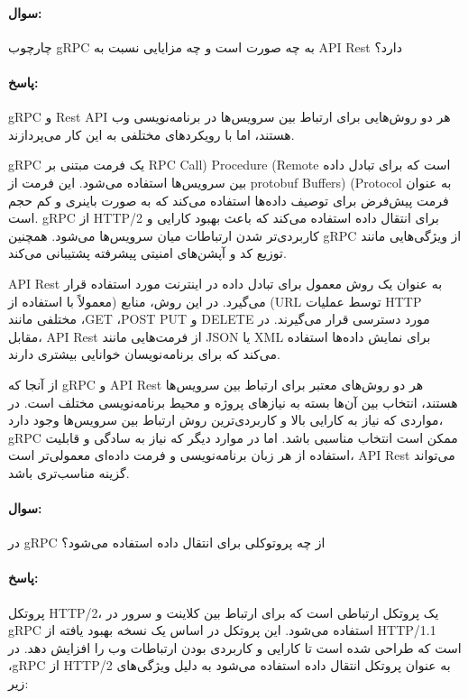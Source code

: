 \documentclass[a4paper,10pt]{article}
\begin{document}
    \paragraph{سوال:} چارچوب gRPC به چه صورت است و چه مزایایی نسبت به API Rest دارد؟

    \paragraph{پاسخ:} gRPC و Rest API هر دو روش‌هایی برای ارتباط بین سرویس‌ها در برنامه‌نویسی وب هستند، اما با رویکردهای مختلفی به این کار می‌پردازند.

    gRPC یک فرمت مبتنی بر RPC Call) Procedure (Remote است که برای تبادل داده بین سرویس‌ها استفاده می‌شود. این فرمت از protobuf Buffers) (Protocol به عنوان فرمت پیش‌فرض برای توصیف داده‌ها استفاده می‌کند که به صورت باینری و کم حجم است. gRPC از HTTP/2 برای انتقال داده استفاده می‌کند که باعث بهبود کارایی و کاربردی‌تر شدن ارتباطات میان سرویس‌ها می‌شود. همچنین gRPC از ویژگی‌هایی مانند توزیع کد و آپشن‌های امنیتی پیشرفته پشتیبانی می‌کند.
    
    API Rest به عنوان یک روش معمول برای تبادل داده در اینترنت مورد استفاده قرار می‌گیرد. در این روش، منابع (معمولاً با استفاده از (URL توسط عملیات HTTP مختلفی مانند ،GET ،POST PUT و DELETE مورد دسترسی قرار می‌گیرند. در مقابل، API Rest از فرمت‌هایی مانند JSON یا XML برای نمایش داده‌ها استفاده می‌کند که برای برنامه‌نویسان خوانایی بیشتری دارند.
    
    از آنجا که gRPC و API Rest هر دو روش‌های معتبر برای ارتباط بین سرویس‌ها هستند، انتخاب بین آن‌ها بسته به نیازهای پروژه و محیط برنامه‌نویسی مختلف است. در مواردی که نیاز به کارایی بالا و کاربردی‌ترین روش ارتباط بین سرویس‌ها وجود دارد، gRPC ممکن است انتخاب مناسبی باشد. اما در موارد دیگر که نیاز به سادگی و قابلیت استفاده از هر زبان برنامه‌نویسی و فرمت داده‌ای معمولی‌تر است، API Rest می‌تواند گزینه مناسب‌تری باشد.

    \noindent\hrulefill

    \paragraph{سوال:} در gRPC از چه پروتوکلی برای انتقال داده استفاده می‌شود؟

    \paragraph{پاسخ:} پروتکل HTTP/2، یک پروتکل ارتباطی است که برای ارتباط بین کلاینت و سرور در gRPC استفاده می‌شود. این پروتکل در اساس یک نسخه بهبود یافته از HTTP/1.1 است که طراحی شده است تا کارایی و کاربردی بودن ارتباطات وب را افزایش دهد. در ،gRPC از HTTP/2 به عنوان پروتکل انتقال داده استفاده می‌شود به دلیل ویژگی‌های زیر:
\end{document}
